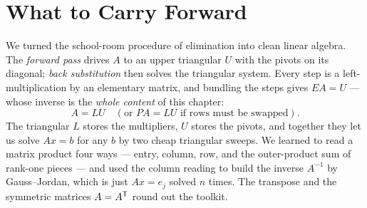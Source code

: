 \section{What to Carry Forward}

We turned the school-room procedure of elimination into clean linear algebra. The \emph{forward pass} drives $A$ to an upper triangular $U$ with the pivots on its diagonal; \emph{back substitution} then solves the triangular system. Every step is a left-multiplication by an elementary matrix, and bundling the steps gives $EA=U$ --- whose inverse is the \emph{whole content} of this chapter:
\[
A = LU
\quad(\text{or } PA=LU \text{ if rows must be swapped}).
\]
The triangular $L$ stores the multipliers, $U$ stores the pivots, and together they let us solve $Ax=b$ for any $b$ by two cheap triangular sweeps. We learned to read a matrix product four ways --- entry, column, row, and the outer-product sum of rank-one pieces --- and used the column reading to build the inverse $A^{-1}$ by Gauss--Jordan, which is just $Ax=e_j$ solved $n$ times. The transpose and the symmetric matrices $A=A^{\mathsf T}$ round out the toolkit.

